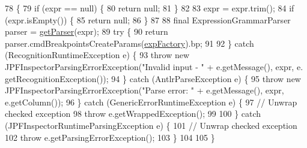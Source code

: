 \begin{DoxyCode}
78                                                                                                            
                                                 \{
79     \textcolor{keywordflow}{if} (expr == null) \{
80       \textcolor{keywordflow}{return} null;
81     \}
82 
83     expr = expr.trim();
84     \textcolor{keywordflow}{if} (expr.isEmpty()) \{
85       \textcolor{keywordflow}{return} null;
86     \}
87 
88     \textcolor{keyword}{final} ExpressionGrammarParser parser = \hyperlink{classgov_1_1nasa_1_1jpf_1_1inspector_1_1server_1_1expression_1_1_expression_parser_aaef85bb6690c79fcbadd105acdf46e18}{getParser}(expr);
89     \textcolor{keywordflow}{try} \{
90       \textcolor{keywordflow}{return} parser.cmdBreakpointsCreateParams(\hyperlink{classgov_1_1nasa_1_1jpf_1_1inspector_1_1server_1_1expression_1_1_expression_parser_ac104f9da945e44fd45fb00c2dfb83706}{expFactory}).bp;
91 
92     \} \textcolor{keywordflow}{catch} (RecognitionRuntimeException e) \{
93       \textcolor{keywordflow}{throw} \textcolor{keyword}{new} JPFInspectorParsingErrorException(\textcolor{stringliteral}{"Invalid input - "} + e.getMessage(), expr, e.
      getRecognitionException());
94     \} \textcolor{keywordflow}{catch} (AntlrParseException e) \{
95       \textcolor{keywordflow}{throw} \textcolor{keyword}{new} JPFInspectorParsingErrorException(\textcolor{stringliteral}{"Parse error: "} + e.getMessage(), expr, e.getColumn());
96     \} \textcolor{keywordflow}{catch} (GenericErrorRuntimeException e) \{
97       \textcolor{comment}{// Unwrap checked exception}
98       \textcolor{keywordflow}{throw} e.getWrappedException();
99 
100     \} \textcolor{keywordflow}{catch} (JPFInspectorRuntimeParsingException e) \{
101       \textcolor{comment}{// Unwrap checked exception}
102       \textcolor{keywordflow}{throw} e.getParsingErrorException();
103     \}
104 
105   \}
\end{DoxyCode}
